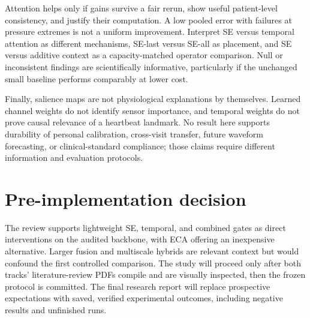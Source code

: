 \documentclass[11pt]{article}
\begin{document}
Attention helps only if gains survive a fair rerun, show useful patient-level consistency, and justify their computation. A low pooled error with failures at pressure extremes is not a uniform improvement. Interpret SE versus temporal attention as different mechanisms, SE-last versus SE-all as placement, and SE versus additive context as a capacity-matched operator comparison. Null or inconsistent findings are scientifically informative, particularly if the unchanged small baseline performs comparably at lower cost.

Finally, salience maps are not physiological explanations by themselves. Learned channel weights do not identify sensor importance, and temporal weights do not prove causal relevance of a heartbeat landmark. No result here supports durability of personal calibration, cross-visit transfer, future waveform forecasting, or clinical-standard compliance; those claims require different information and evaluation protocols.

\section{Pre-implementation decision}
The review supports lightweight SE, temporal, and combined gates as direct interventions on the audited backbone, with ECA offering an inexpensive alternative. Larger fusion and multiscale hybrids are relevant context but would confound the first controlled comparison. The study will proceed only after both tracks' literature-review PDFs compile and are visually inspected, then the frozen protocol is committed. The final research report will replace prospective expectations with saved, verified experimental outcomes, including negative results and unfinished runs.


\end{document}
